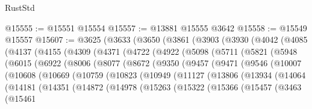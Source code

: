 \begin{lexlean}{RustStd}
\begin{coremodule}
@15555 := @15551 @15554
@15557 := @13881 @15555 @3642
@15558 := @15549 @15557
@15607 := @3625
    (@3633
      (@3650
        (@3861
          (@3903
            (@3930
              (@4042
                (@4085
                  (@4137
                    (@4155
                      (@4309
                        (@4371
                          (@4722
                            (@4922
                              (@5098
                                (@5711
                                  (@5821
                                    (@5948
                                      (@6015
                                        (@6922
                                          (@8006
                                            (@8077
                                              (@8672
                                                (@9350
                                                  (@9457
                                                    (@9471
                                                      (@9546
                                                        (@10007
                                                          (@10608
                                                            (@10669
                                                              (@10759
                                                                (@10823
                                                                  (@10949
                                                                    (@11127
                                                                      (@13806
                                                                        (@13934
                                                                          (@14064
                                                                            (@14181
                                                                              (@14351
                                                                                (@14872
                                                                                  (@14978
                                                                                    (@15263
                                                                                      (@15322
                                                                                        (@15366
                                                                                          (@15457
                                                                                            (@3463
                                                                                              (@15461

\end{coremodule}
\end{lexlean}
